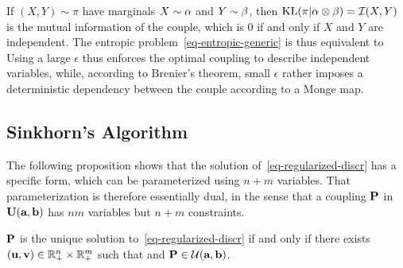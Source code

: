 \begin{rem}
	If $(X,Y) \sim \pi$ have marginals $X \sim \al$ and $Y \sim \be$, then $\KL(\pi|\al \otimes \be) = \Ii(X,Y)$ is the mutual information of the couple, which is 0 if and only if $X$ and $Y$ are independent. The entropic problem~\eqref{eq-entropic-generic} is thus equivalent to
	Using a large $\epsilon$ thus enforces the optimal coupling to describe independent variables, while, according to Brenier's theorem, small $\epsilon$ rather imposes a deterministic dependency between the couple according to a Monge map. 
\end{rem}


\subsection{Sinkhorn's Algorithm}

The following proposition shows that the solution of~\eqref{eq-regularized-discr} has a specific form, which can be parameterized using $n+m$ variables. That parameterization is therefore essentially dual, in the sense that a coupling $\P$ in $\CouplingsD(\a,\b)$ has $nm$ variables but $n+m$ constraints.

\begin{prop}\label{prop-regularized-primal}
$\P$ is the unique solution to~\eqref{eq-regularized-discr} if and only if there exists  $(\uD,\vD) \in \RR_+^n \times \RR_+^m$ such that 
and $\P \in \Couplings(\a,\b)$.
\end{prop} 

